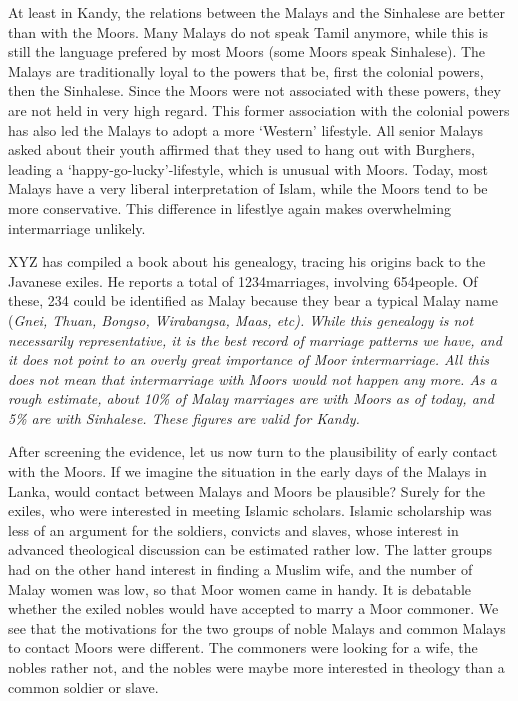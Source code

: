 At least in Kandy, the relations between the Malays and the Sinhalese are better than with the Moors. Many Malays do not speak Tamil anymore, while this is still the language prefered by most Moors (some Moors speak Sinhalese). The Malays are traditionally loyal to the powers that be, first the colonial powers, then the Sinhalese. Since the Moors were not associated with these powers, they are not held in very high regard. This former association with the colonial powers has also led the Malays to adopt a more `Western' lifestyle. All senior Malays asked about their youth affirmed that they used to hang out with Burghers, leading a `happy-go-lucky'-lifestyle, which is unusual with Moors. Today, most Malays have a very liberal interpretation of Islam, while the Moors tend to be more conservative. This difference in lifestlye again makes overwhelming intermarriage unlikely.

XYZ has compiled a book about his genealogy, tracing his origins back to the Javanese exiles. He reports a total of 1234\kuckn marriages, involving 654\kuckn people. Of these, 234 could be identified as Malay because they bear a typical Malay name (\em Gnei, Thuan, Bongso, Wirabangsa, Maas, etc\em). While this genealogy is not necessarily representative, it is the best record of marriage patterns we have, and it does not point to an overly great importance of Moor intermarriage. All this does not mean that intermarriage with Moors would not happen any more. As  a rough estimate, about 10\% of Malay marriages are with Moors as of today, and 5\% are with Sinhalese. These figures are valid for Kandy.

After screening the evidence, let us now turn to the plausibility of early contact with the Moors.
If we imagine the situation in the early days of the Malays in Lanka, would contact between Malays and Moors be plausible? Surely for the exiles, who were interested in meeting Islamic scholars. Islamic scholarship was less of an argument for the soldiers, convicts and slaves, whose interest in advanced theological discussion can be estimated rather low. The latter groups had on the other hand interest in finding a Muslim wife, and the number of Malay women was low, so that Moor women came in handy. It is debatable whether the exiled nobles would have accepted to marry a Moor commoner. We see that the motivations for the two groups of noble Malays and common Malays to contact Moors were different. The commoners were looking for a wife, the nobles rather not, and the nobles were maybe more interested in theology than a common soldier or slave.

